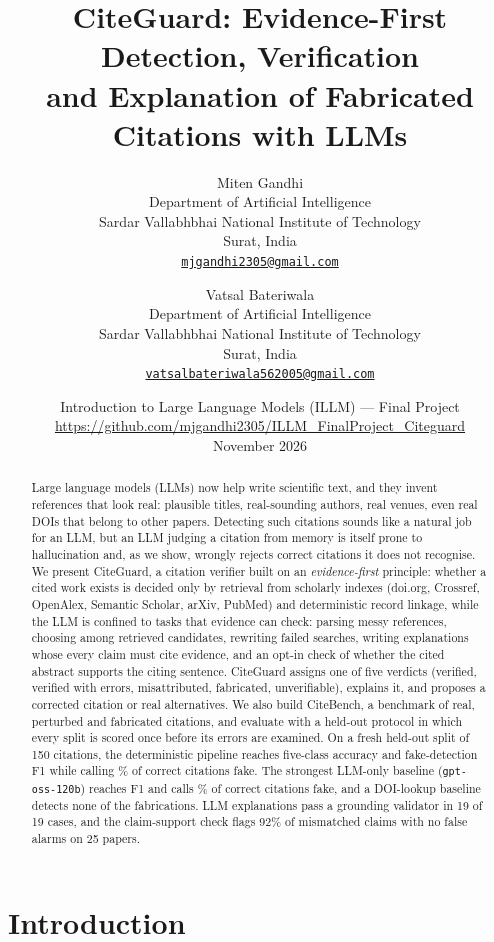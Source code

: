 \documentclass[10pt,twocolumn,a4paper]{article}
\title{\textbf{CiteGuard: Evidence-First Detection, Verification\\ and Explanation of Fabricated Citations with LLMs}}
\author{%
Miten Gandhi\\
\small Department of Artificial Intelligence\\
\small Sardar Vallabhbhai National Institute of Technology\\
\small Surat, India\\
\small \href{mailto:mjgandhi2305@gmail.com}{\texttt{mjgandhi2305@gmail.com}}
\and
Vatsal Bateriwala\\
\small Department of Artificial Intelligence\\
\small Sardar Vallabhbhai National Institute of Technology\\
\small Surat, India\\
\small \href{mailto:vatsalbateriwala562005@gmail.com}{\texttt{vatsalbateriwala562005@gmail.com}}}
\date{\small Introduction to Large Language Models (ILLM) --- Final Project\\
\small \url{https://github.com/mjgandhi2305/ILLM_FinalProject_Citeguard}\\[2pt]
November 2026}
\newcommand{\cg}{CiteGuard}
\begin{document}
\maketitle

\begin{abstract}
Large language models (LLMs) now help write scientific text, and they invent references that look
real: plausible titles, real-sounding authors, real venues, even real DOIs that belong to other
papers. Detecting such citations sounds like a natural job for an LLM, but an LLM judging a citation
from memory is itself prone to hallucination and, as we show, wrongly rejects correct citations it
does not recognise. We present \cg{}, a citation verifier built on an \emph{evidence-first}
principle: whether a cited work exists is decided only by retrieval from scholarly indexes
(doi.org, Crossref, OpenAlex, Semantic Scholar, arXiv, PubMed) and deterministic record linkage,
while the LLM is confined to tasks that evidence can check: parsing messy references,
choosing among retrieved candidates, rewriting failed searches, writing explanations whose every
claim must cite evidence, and an opt-in check of whether the cited abstract supports the citing
sentence. \cg{} assigns one of five verdicts (verified, verified with errors, misattributed,
fabricated, unverifiable), explains it, and proposes a corrected citation or real alternatives. We
also build CiteBench, a benchmark of real, perturbed and fabricated citations, and evaluate with a
held-out protocol in which every split is scored once before its errors are examined. On a fresh
held-out split of 150 citations, the deterministic pipeline reaches \NoLlmAcc{} five-class accuracy
and \NoLlmF{} fake-detection F1 while calling \NoLlmCFPR\% of correct citations fake. The strongest
LLM-only baseline (\texttt{gpt-oss-120b}) reaches \LlmBigF{} F1 and calls \LlmBigCFPR\% of correct
citations fake, and a DOI-lookup baseline detects none of the fabrications. LLM explanations pass a
grounding validator in 19 of 19 cases, and the claim-support check flags 92\% of mismatched claims
with no false alarms on 25 papers.
\end{abstract}

\section{Introduction}
\label{sec:intro}
\end{document}
